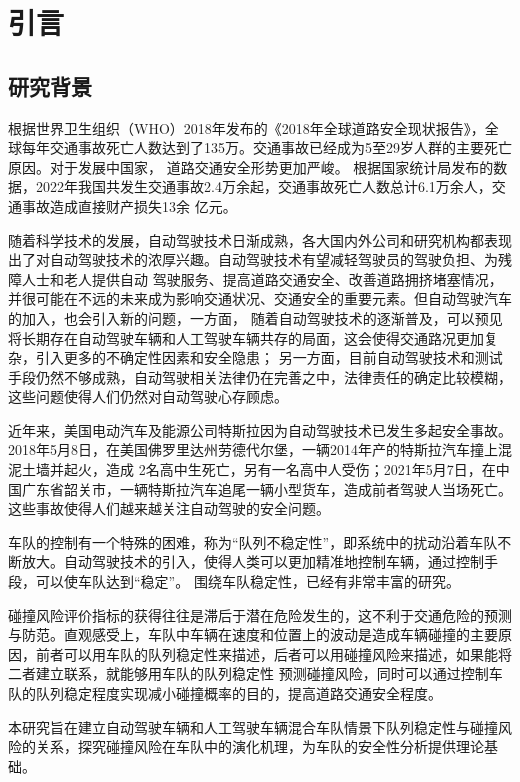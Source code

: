 
\chapter{引言}

\section{研究背景}

根据世界卫生组织（WHO）2018年发布的《2018年全球道路安全现状报告》，全球每年交通事故死亡人数达到了135万。交通事故已经成为5至29岁人群的主要死亡原因。对于发展中国家，
道路交通安全形势更加严峻。\cite{WHO} 根据国家统计局发布的数据，2022年我国共发生交通事故2.4万余起，交通事故死亡人数总计6.1万余人，交通事故造成直接财产损失13余
亿元。\cite{stats_gov}

随着科学技术的发展，自动驾驶技术日渐成熟，各大国内外公司和研究机构都表现出了对自动驾驶技术的浓厚兴趣。自动驾驶技术有望减轻驾驶员的驾驶负担、为残障人士和老人提供自动
驾驶服务、提高道路交通安全、改善道路拥挤堵塞情况，并很可能在不远的未来成为影响交通状况、交通安全的重要元素。但自动驾驶汽车的加入，也会引入新的问题，一方面，
随着自动驾驶技术的逐渐普及，可以预见将长期存在自动驾驶车辆和人工驾驶车辆共存的局面，这会使得交通路况更加复杂，引入更多的不确定性因素和安全隐患；
另一方面，目前自动驾驶技术和测试手段仍然不够成熟，自动驾驶相关法律仍在完善之中，法律责任的确定比较模糊，这些问题使得人们仍然对自动驾驶心存顾虑。

近年来，美国电动汽车及能源公司特斯拉因为自动驾驶技术已发生多起安全事故。2018年5月8日，在美国佛罗里达州劳德代尔堡，一辆2014年产的特斯拉汽车撞上混泥土墙并起火，造成
2名高中生死亡，另有一名高中人受伤；2021年5月7日，在中国广东省韶关市，一辆特斯拉汽车追尾一辆小型货车，造成前者驾驶人当场死亡。这些事故使得人们越来越关注自动驾驶的安全问题。

车队的控制有一个特殊的困难，称为“队列不稳定性”\cite{FENG201981}，即系统中的扰动沿着车队不断放大。自动驾驶技术的引入，使得人类可以更加精准地控制车辆，通过控制手段，可以使车队达到“稳定”。
围绕车队稳定性，已经有非常丰富的研究。

碰撞风险评价指标的获得往往是滞后于潜在危险发生的，这不利于交通危险的预测与防范。直观感受上，车队中车辆在速度和位置上的波动是造成车辆碰撞的主要原因，前者可以用车队的队列稳定性来描述，后者可以用碰撞风险来描述，如果能将二者建立联系，就能够用车队的队列稳定性
预测碰撞风险，同时可以通过控制车队的队列稳定程度实现减小碰撞概率的目的，提高道路交通安全程度。

本研究旨在建立自动驾驶车辆和人工驾驶车辆混合车队情景下队列稳定性与碰撞风险的关系，探究碰撞风险在车队中的演化机理，为车队的安全性分析提供理论基础。




